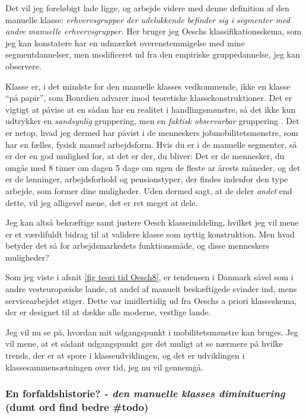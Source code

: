 Det vil jeg foreløbigt lade ligge, og arbejde videre med denne definition af den manuelle klasse: \emph{erhvervsgrupper der udelukkende befinder sig i segmenter med andre manuelle erhvervsgrupper.} Her bruger jeg Oeschs klassifikationsskema, som jeg kan konstatere har en udmærket overenstemmigelse med mine segmentdannelser, men modificeret ud fra den empiriske gruppedannelse, jeg kan observere. 

Klasse er, i det mindste for den manuelle klasses vedkommende, ikke en klasse “på papir”, som Bourdieu advarer imod teoretiske klassekonstruktioner. Det er vigtigt at påvise at en sådan har en realitet i handlingsmønstre, så det ikke kun udtrykker en \emph{sandsynlig} gruppering, men en \emph{faktisk observarbar} gruppering \parencite[7]{Bourdieu1987}. Det er netop, hvad jeg dermed har påvist i de menneskers jobmobilitetsmønstre, som har en fælles, fysisk manuel arbejdsform. Hvis du er i de manuelle segmenter, så er der en god mulighed for, at det er der, du bliver: Det er de mennesker, du omgås med 8 timer om dagen 5 dage om ugen de fleste ar årests måneder, og det er de lønninger, arbejdsforhold og pensionstyper, der findes indenfor den type arbejde, som former dine muligheder. Uden dermed sagt, at de deler \emph{andet} end dette, vil jeg alligevel mene, det er ret meget at dele. 


Jeg kan altså bekræftige samt justere Oesch klasseinddeling, hvilket jeg vil mene er et værdifuldt bidrag til at validere klasse som nyttig konstruktion. Men hvad betyder det så for arbejdsmarkedets funktionsmåde, og disse menneskers muligheder? 

Som jeg viste i afsnit \ref{fig teori tid Oesch8}, er tendensen i Danmark såvel som i andre vesteuropæiske lande, at andel af manuelt beskæftigede svinder ind, mens servicearbejdet stiger. Dette var imidlertidig ud fra Oeschs a priori klasseskema, der er designet til at dække alle moderne, vestlige lande. 



Jeg vil nu se på, hvordan mit udgangspunkt i mobilitetsmønstre kan bruges. Jeg vil mene, at et sådant udgangspunkt gør det muligt at se nærmere på hvilke trends, der er at spore i klasseudviklingen, og det er udviklingen i klassesammensætningen over tid, jeg nu vil gennemgå.

%
\subsubsection{En forfaldshistorie? \emph{- den manuelle klasses diminituering} (dumt ord find bedre \#todo)}
%
 

